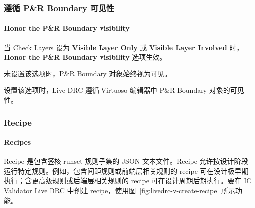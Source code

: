 \subsubsection{遵循 P\&R Boundary 可见性}
\paragraph*{Honor the P\&R Boundary visibility}

当 Check Layers 设为 \textbf{Visible Layer Only} 或 \textbf{Visible Layer Involved} 时，\textbf{Honor the P\&R Boundary visibility} 选项生效。

未设置该选项时，P\&R Boundary 对象始终视为可见。

设置该选项时，Live DRC 遵循 Virtuoso 编辑器中 P\&R Boundary 对象的可见性。


\subsubsection{Recipe}
\paragraph*{Recipes}

Recipe 是包含签核 runset 规则子集的 JSON 文本文件。Recipe 允许按设计阶段运行特定规则。例如，包含间距规则或前端层相关规则的 recipe 可在设计极早期执行；含更高级规则或后端层相关规则的 recipe 可在设计周期后期执行。要在 IC Validator Live DRC 中创建 recipe，使用图~\ref{fig:livedrc-v-create-recipe} 所示功能。


